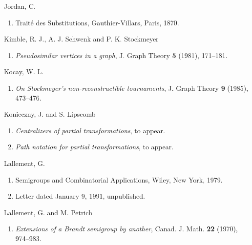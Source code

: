 \documentclass{surv-l}
\numberwithin{equation}{section}
\numberwithin{table}{section}
\numberwithin{figure}{section}
\theoremstyle{plain}
\theoremstyle{definition}
\begin{document}
\begin{thebibliography}{}
\item[] Jordan, C.
\begin{enumerate}
\item \label{bib34} Trait\'{e} des Substitutions, Gauthier-Villars, Paris,
1870.
\end{enumerate}

\item[] Kimble, R. J., A. J. Schwenk and P. K. Stockmeyer
\begin{enumerate}
\item \label{bib35} \emph{Pseudosimilar vertices in a graph}, J.
Graph Theory \textbf{5} (1981), 171--181.
\end{enumerate}

\item[] Kocay, W. L.
\begin{enumerate}
\item \label{bib36} \emph{On Stockmeyer's non-reconstructible
tournaments}, J. Graph Theory \textbf{9} (1985), 473--476.
\end{enumerate}

\item[] Konieczny, J. and S. Lipscomb
\begin{enumerate}
\item \label{bib37} \emph{Centralizers of partial transformations}, to appear.

\item \label{bib37a} \emph{Path notation for partial transformations}, to
appear.
\end{enumerate}

\item[] Lallement, G.
\begin{enumerate}
\item \label{bib38} Semigroups and Combinatorial Applications, Wiley, New
York, 1979.

\item \label{bib38a} Letter dated January 9, 1991, unpublished.
\end{enumerate}

\item[] Lallement, G. and M. Petrich
\begin{enumerate}
\item \label{bib39} \emph{Extensions of a Brandt semigroup
by another}, Canad. J. Math. \textbf{22} (1970), 974--983.
\end{enumerate}


\end{thebibliography}
\end{document}
